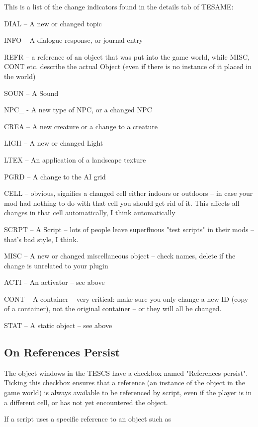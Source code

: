 \documentclass[
]{article}
\begin{document}
This is a list of the change indicators found in the details tab of
TESAME:

DIAL -- A new or changed topic

INFO -- A dialogue response, or journal entry

REFR -- a reference of an object that was put into the game world, while
MISC, CONT etc. describe the actual Object (even if there is no instance
of it placed in the world)

SOUN -- A Sound

NPC\_ - A new type of NPC, or a changed NPC

CREA -- A new creature or a change to a creature

LIGH -- A new or changed Light

LTEX -- An application of a landscape texture

PGRD -- A change to the AI grid

CELL -- obvious, signifies a changed cell either indoors or outdoors --
in case your mod had nothing to do with that cell you should get rid of
it. This affects all changes in that cell automatically, I think
automatically

SCRPT -- A Script -- lots of people leave superfluous "test scripts" in
their mods -- that's bad style, I think.

MISC -- A new or changed miscellaneous object -- check names, delete if
the change is unrelated to your plugin

ACTI -- An activator -- see above

CONT -- A container -- very critical: make sure you only change a new ID
(copy of a container), not the original container -- or they will all be
changed.

STAT -- A static object -- see above

\hypertarget{on-references-persist}{%
\subsection{\texorpdfstring{\hfill\break
On References
Persist}{ On References Persist}}\label{on-references-persist}}

The object windows in the TESCS have a checkbox named "References
persist". Ticking this checkbox ensures that a reference (an instance of
the object in the game world) is always available to be referenced by
script, even if the player is in a different cell, or has not yet
encountered the object.

If a script uses a specific reference to an object such as
\end{document}
